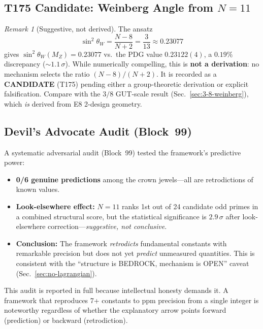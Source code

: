 \documentclass[aps,prd,twocolumn,superscriptaddress,floatfix,nofootinbib]{revtex4-2}
\theoremstyle{definition}
\theoremstyle{remark}
\newtheorem{remark}[theorem]{Remark}
\begin{document}
\subsection{T175 Candidate: Weinberg Angle from $N{=}11$}
\label{sec:t175-candidate}

\begin{remark}[Suggestive, not derived]
The ansatz
\begin{equation}
\sin^2\theta_W = \frac{N-8}{N+2} = \frac{3}{13}
\approx 0.23077
\label{eq:weinberg-n11}
\end{equation}
gives $\sin^2\theta_W(M_Z) = 0.23077$ vs.\ the PDG value $0.23122(4)$,
a $0.19\%$ discrepancy ($\sim\!1.1\,\sigma$).  While numerically
compelling, this is \textbf{not a derivation}: no mechanism selects the
ratio $(N{-}8)/(N{+}2)$.  It is recorded as a \textbf{CANDIDATE} (T175)
pending either a group-theoretic derivation or explicit falsification.
Compare with the $3/8$ GUT-scale result (Sec.~\ref{sec:3-8-weinberg}),
which \emph{is} derived from E8 2-design geometry.
\end{remark}

\subsection{Devil's Advocate Audit (Block~99)}
\label{sec:devils-advocate}

A systematic adversarial audit (Block~99) tested the framework's
predictive power:

\begin{itemize}
\item \textbf{0/6 genuine predictions} among the crown jewels---all are
      retrodictions of known values.
\item \textbf{Look-elsewhere effect:} $N{=}11$ ranks 1st out of 24
      candidate odd primes in a combined structural score, but the
      statistical significance is $2.9\,\sigma$ after look-elsewhere
      correction---\emph{suggestive, not conclusive}.
\item \textbf{Conclusion:} The framework \emph{retrodicts} fundamental
      constants with remarkable precision but does not yet
      \emph{predict} unmeasured quantities.  This is consistent with the
      ``structure is BEDROCK, mechanism is OPEN'' caveat
      (Sec.~\ref{sec:no-lagrangian}).
\end{itemize}

\noindent
This audit is reported in full because intellectual honesty demands it.
A framework that reproduces 7+ constants to ppm precision from a single
integer is noteworthy regardless of whether the explanatory arrow points
forward (prediction) or backward (retrodiction).
\end{document}
